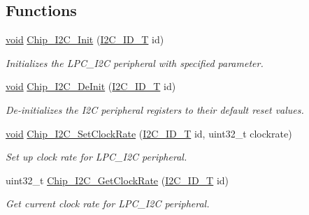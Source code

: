 \subsection*{Functions}
\begin{DoxyCompactItemize}
\item 
\hyperlink{Paradigm_2Tern__EE_2small_2portmacro_8h_a14d32f8130d3c0b212cfc751730b5b49}{void} \hyperlink{group__I2C__17XX__40XX_gab79263d278814945df2cd44c5db7b514}{Chip\-\_\-\-I2\-C\-\_\-\-Init} (\hyperlink{group__I2C__17XX__40XX_ga957556a4d900506cd4cba8427afd81e6}{I2\-C\-\_\-\-I\-D\-\_\-\-T} id)
\begin{DoxyCompactList}\small\item\em Initializes the L\-P\-C\-\_\-\-I2\-C peripheral with specified parameter. \end{DoxyCompactList}\item 
\hyperlink{Paradigm_2Tern__EE_2small_2portmacro_8h_a14d32f8130d3c0b212cfc751730b5b49}{void} \hyperlink{group__I2C__17XX__40XX_ga334c2c12edda443a7e949a1ea4a6a646}{Chip\-\_\-\-I2\-C\-\_\-\-De\-Init} (\hyperlink{group__I2C__17XX__40XX_ga957556a4d900506cd4cba8427afd81e6}{I2\-C\-\_\-\-I\-D\-\_\-\-T} id)
\begin{DoxyCompactList}\small\item\em De-\/initializes the I2\-C peripheral registers to their default reset values. \end{DoxyCompactList}\item 
\hyperlink{Paradigm_2Tern__EE_2small_2portmacro_8h_a14d32f8130d3c0b212cfc751730b5b49}{void} \hyperlink{group__I2C__17XX__40XX_ga17fac5d72058db8eed11d247e78b74ed}{Chip\-\_\-\-I2\-C\-\_\-\-Set\-Clock\-Rate} (\hyperlink{group__I2C__17XX__40XX_ga957556a4d900506cd4cba8427afd81e6}{I2\-C\-\_\-\-I\-D\-\_\-\-T} id, uint32\-\_\-t clockrate)
\begin{DoxyCompactList}\small\item\em Set up clock rate for L\-P\-C\-\_\-\-I2\-C peripheral. \end{DoxyCompactList}\item 
uint32\-\_\-t \hyperlink{group__I2C__17XX__40XX_ga6b13511432337d21b8cd325651cc5b63}{Chip\-\_\-\-I2\-C\-\_\-\-Get\-Clock\-Rate} (\hyperlink{group__I2C__17XX__40XX_ga957556a4d900506cd4cba8427afd81e6}{I2\-C\-\_\-\-I\-D\-\_\-\-T} id)
\begin{DoxyCompactList}\small\item\em Get current clock rate for L\-P\-C\-\_\-\-I2\-C peripheral. \end{DoxyCompactList}\item 

\end{DoxyCompactItemize}
